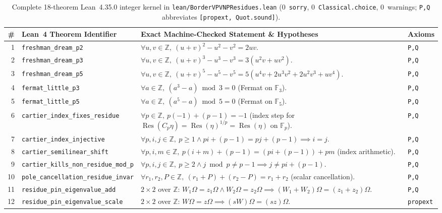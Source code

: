 \documentclass[10pt,twocolumn]{article}
\newcommand{\ZZ}{\mathbb{Z}}
\newcommand{\FF}{\mathbb{F}}
\newcommand{\Res}{\operatorname{Res}}
\begin{document}
\begin{table}[t]
\centering
\caption{Complete 18-theorem Lean~4.35.0 integer kernel in \texttt{lean/BorderVPVNPResidues.lean} ($0$~\texttt{sorry}, $0$~\texttt{Classical.choice}, $0$~warnings; \texttt{P,Q} abbreviates \texttt{[propext, Quot.sound]}).}
\label{tab:lean}
\scriptsize
\setlength{\tabcolsep}{2.8pt}
\begin{tabular}{@{}r l p{10.6cm} l@{}}
\toprule
\# & Lean~4 Theorem Identifier & Exact Machine-Checked Statement \& Hypotheses & Axioms \\
\midrule
1 & \texttt{freshman\_dream\_p2} & $\forall u,v\in\ZZ,\ (u+v)^2 - u^2 - v^2 = 2uv$. & \texttt{P,Q} \\
2 & \texttt{freshman\_dream\_p3} & $\forall u,v\in\ZZ,\ (u+v)^3 - u^3 - v^3 = 3(u^2 v + u v^2)$. & \texttt{P,Q} \\
3 & \texttt{freshman\_dream\_p5} & $\forall u,v\in\ZZ,\ (u+v)^5 - u^5 - v^5 = 5(u^4 v + 2u^3 v^2 + 2u^2 v^3 + u v^4)$. & \texttt{P,Q} \\
4 & \texttt{fermat\_little\_p3} & $\forall a\in\ZZ,\ (a^3 - a) \bmod 3 = 0$ (Fermat on $\FF_3$). & \texttt{P,Q} \\
5 & \texttt{fermat\_little\_p5} & $\forall a\in\ZZ,\ (a^5 - a) \bmod 5 = 0$ (Fermat on $\FF_5$). & \texttt{P,Q} \\
6 & \texttt{cartier\_index\_fixes\_residue} & $\forall p\in\ZZ,\ p(-1)+(p-1)=-1$ (index step for $\Res(C_p\eta)=\Res(\eta)^{1/p}=\Res(\eta)$ on $\FF_p$). & \texttt{P,Q} \\
7 & \texttt{cartier\_index\_injective} & $\forall p,i,j\in\ZZ,\ p\ge 1 \wedge pi+(p-1)=pj+(p-1) \implies i=j$. & \texttt{P,Q} \\
8 & \texttt{cartier\_semilinear\_shift} & $\forall p,i,m\in\ZZ,\ p(i+m)+(p-1) = (pi+(p-1))+pm$ (index arithmetic). & \texttt{P,Q} \\
9 & \texttt{cartier\_kills\_non\_residue\_mod\_p} & $\forall p,i,j\in\ZZ,\ p\ge 2 \wedge j\bmod p\ne p-1 \implies j\ne pi+(p-1)$. & \texttt{P,Q} \\
10 & \texttt{pole\_cancellation\_residue\_invar} & $\forall r_1,r_2,P\in\ZZ,\ (r_1+P)+(r_2-P) = r_1+r_2$ (scalar cancellation). & \texttt{P,Q} \\
11 & \texttt{residue\_pin\_eigenvalue\_add} & $2\times 2$ over $\ZZ$: $W_1\Omega=z_1\Omega \wedge W_2\Omega=z_2\Omega \implies (W_1+W_2)\Omega=(z_1+z_2)\Omega$. & \texttt{P,Q} \\
12 & \texttt{residue\_pin\_eigenvalue\_scale} & $2\times 2$ over $\ZZ$: $W\Omega=z\Omega \implies (sW)\Omega=(sz)\Omega$. & \texttt{propext} \\

\end{tabular}
\end{table}
\end{document}
